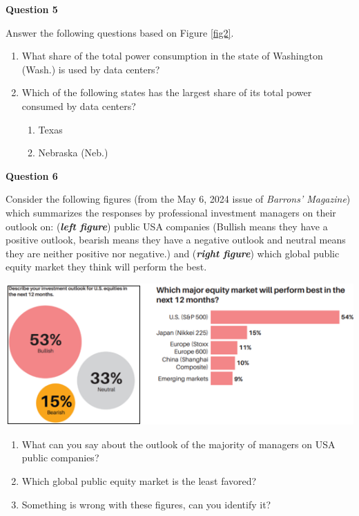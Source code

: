 \documentclass[
]{book}
\begin{document}
\textbf{Question 5}

Answer the following questions based on Figure \ref{fig2}.

\begin{enumerate}
\def\labelenumi{\alph{enumi}.}
\item
  What share of the total power consumption in the state of Washington (Wash.) is used by data centers?
\item
  Which of the following states has the largest share of its total power consumed by data centers?

  \begin{enumerate}
  \def\labelenumii{\roman{enumii}.}
  \item
    Texas
  \item
    Nebraska (Neb.)
  \end{enumerate}
\end{enumerate}

\textbf{Question 6}

Consider the following figures (from the May 6, 2024 issue of \emph{Barrons' Magazine}) which summarizes the responses by professional investment managers on their outlook on: (\textbf{\emph{left figure}}) public USA companies (Bullish means they have a positive outlook, bearish means they have a negative outlook and neutral means they are neither positive nor negative.) and (\textbf{\emph{right figure}}) which global public equity market they think will perform the best.

\includegraphics{images/Section 1 - 1.png}

\begin{enumerate}
\def\labelenumi{\alph{enumi}.}
\item
  What can you say about the outlook of the majority of managers on USA public companies?
\item
  Which global public equity market is the least favored?
\item
  Something is wrong with these figures, can you identify it?
\end{enumerate}
\end{document}
